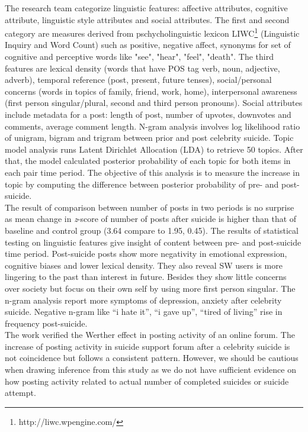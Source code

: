 The research team categorize linguistic features: affective attributes, cognitive attribute, linguistic style attributes and social attributes. The first and second category are measures derived from pschycholinguistic lexicon LIWC\footnote{http://liwc.wpengine.com/} (Linguistic Inquiry and Word Count) such as positive, negative affect, synonyms for set of cognitive and perceptive words like "see", "hear", "feel", "death". The third features are lexical density (words that have POS tag verb, noun, adjective, adverb), temporal reference (post, present, future tenses), social/personal concerns (words in topics of family, friend, work, home), interpersonal awareness (first person singular/plural, second and third person pronouns). Social attributes include metadata for a post: length of post, number of upvotes, downvotes and comments, average comment length. N-gram analysis involves log likelihood ratio of unigram, bigram and trigram between prior and post celebrity suicide. Topic model analysis runs Latent Dirichlet Allocation (LDA) \cite{Blei2003} to retrieve 50 topics. After that, the model calculated posterior probability of each topic for both items in each pair time period. The objective of this analysis is to measure the increase in topic by computing the difference between posterior probability of pre- and post-suicide.\\
The result of comparison between number of posts in two periods is no surprise as mean change in \textit{z}-score of number of posts after suicide is higher than that of baseline and control group (3.64 compare to 1.95, 0.45). The results of statistical testing on linguistic features give insight of content between pre- and post-suicide time period. Post-suicide posts show more negativity in emotional expression, cognitive biases and lower lexical density. They also reveal SW users is more lingering to the past than interest in future. Besides they show little concerns over society but focus on their own self by using more first person singular. The n-gram analysis report more symptoms of depression, anxiety after celebrity suicide. Negative n-gram like “i hate it”, “i gave up”, “tired of living” rise in frequency post-suicide. \\
The work verified the Werther effect in posting activity of an online forum. The increase of posting activity in suicide support forum after a celebrity suicide is not coincidence but follows a consistent pattern. However, we should be cautious when drawing inference from this study as we do not have sufficient evidence on how posting activity related to actual number of completed suicides or suicide attempt.\\

